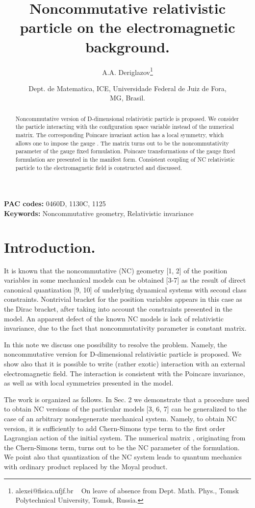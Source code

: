 \documentclass[paper a4]{article}
\title{Noncommutative relativistic particle on the electromagnetic
background.}
\author{A.A. Deriglazov\footnote{alexei@fisica.ufjf.br ~ On leave of
absence from Dept. Math. Phys., Tomsk Polytechnical University,
Tomsk, Russia.}}
\date{Dept. de Matematica, ICE, Universidade Federal de Juiz de Fora,\\
MG, Brasil.}
\begin{document}
\maketitle
\large
\begin{abstract}
Noncommutative version of D-dimensional relativistic particle is proposed.
We consider the particle interacting with the configuration space
variable \myHighlight{$\theta^{\mu\nu}(\tau)$}\coordHE{} instead of the numerical matrix. The
corresponding Poincare invariant action has a local symmetry, which
allows one to impose the gauge \coordHE{}. The
matrix \coordHE{} turns out to be the noncommutativity parameter of
the gauge fixed formulation. Poincare transformations of the gauge
fixed formulation are presented in the manifest form.
Consistent coupling of NC relativistic particle to the electromagnetic
field is constructed and discussed.
\end{abstract}

{\bf PAC codes:} 0460D, 1130C, 1125 \\
{\bf Keywords:} Noncommutative geometry, Relativistic invariance\\

\noindent
\section{Introduction.}
It is known that the
noncommutative (NC) geometry [1, 2] of the position variables in
some mechanical
models can be obtained [3-7] as the result of direct canonical quantization
[9, 10] of underlying dynamical
systems with second class constraints. Nontrivial bracket for
the position variables appears in this case as the Dirac bracket,
after taking into account the constraints presented in the model.
An apparent defect of the known NC models is lack of relativistic invariance,
due to the fact that noncommutativity parameter is constant matrix.

In this note we discuss one possibility to resolve the problem. Namely,
the noncommutative version for D-dimensional
relativistic particle is proposed. We show also that it is possible to write
(rather exotic) interaction with an external electromagnetic field.
The interaction is consistent with the Poincare invariance, as well as
with local symmetries presented in the model.

The work is organized as follows. In Sec. 2 we demonstrate that a
procedure used to obtain NC versions of the particular models
[3, 6, 7] can be generalized to the case of an arbitrary nondegenerate
mechanical system. Namely, to obtain NC version, it is
sufficiently to add Chern-Simons type term to the first order Lagrangian
action of the initial system. The numerical matrix
\coordHE{}, originating from the Chern-Simons term,
turns out to be the NC parameter of the formulation.
We point also that quantization of the NC system leads to quantum
mechanics with ordinary product replaced by the Moyal product.
\end{document}
